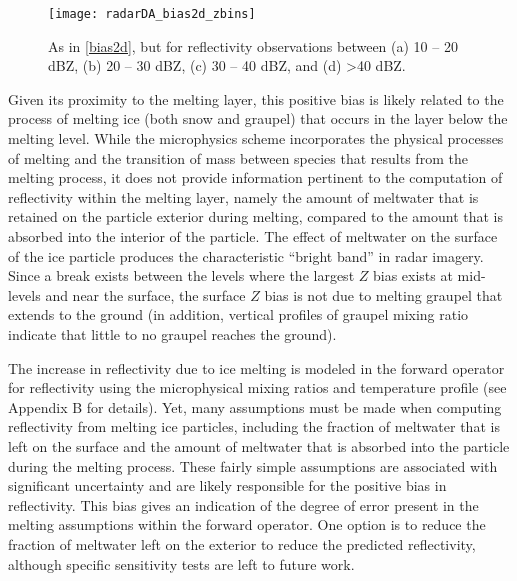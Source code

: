\begin{figure}
\centering
\texttt{[image: radarDA\_bias2d\_zbins]}
\caption{As in \ref{bias2d}, but for reflectivity observations between (a) 10 -- 20 dBZ, (b) 20 -- 30 dBZ, (c) 30 -- 40 dBZ, and (d) \textgreater 40 dBZ.}
\label{bias2d_zbins}
\end{figure}

Given its proximity to the melting layer, this positive bias is likely related to the process of melting ice (both snow and graupel) that occurs in the layer below the melting level. While the microphysics scheme incorporates the physical processes of melting and the transition of mass between species that results from the melting process, it does not provide information pertinent to the computation of reflectivity within the melting layer, namely the amount of meltwater that is retained on the particle exterior during melting, compared to the amount that is absorbed into the interior of the particle. The effect of meltwater on the surface of the ice particle produces the characteristic “bright band” in radar imagery. Since a break exists between the levels where the largest \(Z\) bias exists at mid-levels and near the surface, the surface \(Z\) bias is not due to melting graupel that extends to the ground (in addition, vertical profiles of graupel mixing ratio indicate that little to no graupel reaches the ground).
	
The increase in reflectivity due to ice melting is modeled in the forward operator for reflectivity using the microphysical mixing ratios and temperature profile (see Appendix B for details). Yet, many assumptions must be made when computing reflectivity from melting ice particles, including the fraction of meltwater that is left on the surface and the amount of meltwater that is absorbed into the particle during the melting process. These fairly simple assumptions are associated with significant uncertainty and are likely responsible for the positive bias in reflectivity. This bias gives an indication of the degree of error present in the melting assumptions within the forward operator. One option is to reduce the fraction of meltwater left on the exterior to reduce the predicted reflectivity, although specific sensitivity tests are left to future work.

